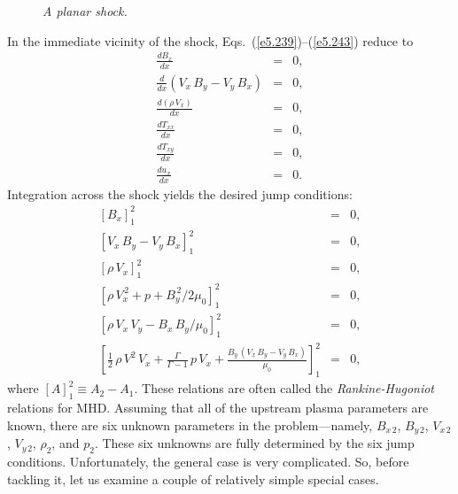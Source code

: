 \begin{figure}
\epsfysize=2.5in
\centerline{}
\caption{\em A planar shock.}\label{f29a}
\end{figure}

In the immediate vicinity of the shock, Eqs.~(\ref{e5.239})--(\ref{e5.243})  reduce to
\begin{eqnarray}
\frac{dB_{x}}{dx} &=& 0,\\[0.5ex]
\frac{d}{dx}(V_x\,B_y-V_y\,B_x)&=&0,\\[0.5ex]
\frac{d (\rho\, V_x)}{dx} &=&0,\\[0.5ex]
\frac{d T_{xx}}{dx} &=&0,\\[0.5ex]
\frac{d T_{xy}}{dx} &=&0,\\[0.5ex]
\frac{d u_x}{dx} &=& 0.
\end{eqnarray}
Integration  across the shock yields the desired jump conditions:
\begin{eqnarray}\label{e5.253}
[B_x]^2_1 &=&0,\\[0.5ex]
[V_x\,B_y-V_y\,B_x]^2_1&=&0,\label{e5.254}\\[0.5ex]
[\rho\,V_x]_1^2&=&0,\\[0.5ex]
[\rho\,V_x^{\,2}+p + B_y^{\,2}/2\mu_0]_1^2&=&0,\\[0.5ex]
[\rho\,V_x\,V_y - B_x\,B_y/\mu_0]^2_1&=&0,\\[0.5ex]
\left[\frac{1}{2}\,\rho\,V^2\,V_x + \frac{\Gamma}{\Gamma-1}\,p\,V_x
+ \frac{B_y\,(V_x\,B_y-V_y\,B_x)}{\mu_0}\right]^2_1&=&0,\label{e5.258}
\end{eqnarray}
where $[A]_1^2\equiv A_2-A_1$. These relations are often called the {\em Rankine-Hugoniot}\/
relations for MHD.  
Assuming that all of the upstream plasma parameters
are known, there are six unknown  parameters in the problem---namely,
$B_{x\,2}$, $B_{y\,2}$, $V_{x\,2}$, $V_{y\,2}$, $\rho_2$, and $p_2$. These six
unknowns are fully determined by the six jump conditions. Unfortunately, the
general case is very complicated. So, before tackling it, let us examine
a couple of relatively simple special cases.

